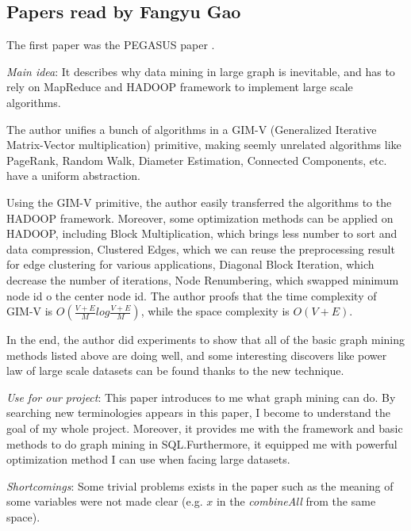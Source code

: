 \subsection{Papers read by Fangyu Gao}
The first paper was the PEGASUS paper \cite{KangTF11}.
\begin{itemize*}
\item {\em Main idea}:
	   It describes why data mining in large graph is inevitable, and has to rely on MapReduce and HADOOP framework to implement large scale algorithms.

       The author unifies a bunch of algorithms in a GIM-V (Generalized Iterative Matrix-Vector multiplication) primitive, making seemly unrelated algorithms like PageRank, Random Walk, Diameter Estimation, Connected Components, etc. have a uniform abstraction. 

       Using the GIM-V primitive, the author easily transferred the algorithms to the HADOOP framework. Moreover, some optimization methods can be applied on HADOOP, including Block Multiplication, which brings less number to sort and data compression, Clustered Edges, which we can reuse the preprocessing result for edge clustering for various applications, Diagonal Block Iteration, which decrease the number of iterations, Node Renumbering, which swapped minimum node id o the center node id. The author proofs that the time complexity of GIM-V is $O(\frac{V+E}{M}log\frac{V+E}{M})$, while the space complexity is $O(V+E)$.

       In the end, the author did experiments to show that all of the basic graph mining methods listed above are doing well, and some interesting discovers like power law of large scale datasets can be found thanks to the new technique.
\item {\em Use for our project}:
	   This paper introduces to me what graph mining can do. By searching new terminologies appears in this paper, I become to understand the goal of my whole project. Moreover, it provides me with the framework and basic methods to do graph mining in SQL.Furthermore, it equipped me with powerful optimization method I can use when facing large datasets.
\item {\em Shortcomings}:
       Some trivial problems exists in the paper such as the meaning of some variables were not made clear (e.g. $x$ in the {\em combineAll} from the same space). 
\end{itemize*}

